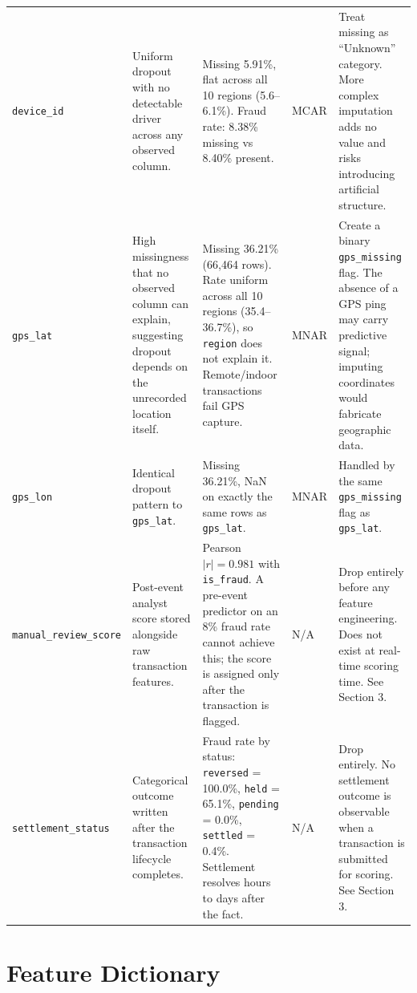 \documentclass[11pt,a4paper]{article}
\begin{document}
\begin{center}
\begin{tabularx}{\textwidth}{@{}P{1.8cm} P{2.3cm} P{3.0cm} P{1.2cm} P{4.5cm}@{}}
\texttt{device\_id} &
Uniform dropout with no detectable driver across any observed column. &
Missing 5.91\%, flat across all 10 regions (5.6--6.1\%). Fraud rate: 8.38\% missing vs 8.40\% present. &
MCAR &
Treat missing as ``Unknown'' category. More complex imputation adds no value and risks introducing artificial structure. \\

\texttt{gps\_lat} &
High missingness that no observed column can explain, suggesting dropout depends on the unrecorded location itself. &
Missing 36.21\% (66,464 rows). Rate uniform across all 10 regions (35.4--36.7\%), so \texttt{region} does not explain it. Remote/indoor transactions fail GPS capture. &
MNAR &
Create a binary \texttt{gps\_missing} flag. The absence of a GPS ping may carry predictive signal; imputing coordinates would fabricate geographic data. \\

\texttt{gps\_lon} &
Identical dropout pattern to \texttt{gps\_lat}. &
Missing 36.21\%, NaN on exactly the same rows as \texttt{gps\_lat}. &
MNAR &
Handled by the same \texttt{gps\_missing} flag as \texttt{gps\_lat}. \\

\texttt{manual\_review\_score} &
Post-event analyst score stored alongside raw transaction features. &
Pearson $|r| = 0.981$ with \texttt{is\_fraud}. A pre-event predictor on an 8\% fraud rate cannot achieve this; the score is assigned only after the transaction is flagged. &
N/A &
Drop entirely before any feature engineering. Does not exist at real-time scoring time. See Section 3. \\

\texttt{settlement\_status} &
Categorical outcome written after the transaction lifecycle completes. &
Fraud rate by status: \texttt{reversed} = 100.0\%, \texttt{held} = 65.1\%, \texttt{pending} = 0.0\%, \texttt{settled} = 0.4\%. Settlement resolves hours to days after the fact. &
N/A &
Drop entirely. No settlement outcome is observable when a transaction is submitted for scoring. See Section 3. \\

\bottomrule
\end{tabularx}
\end{center}

\section{Feature Dictionary}
\end{document}

